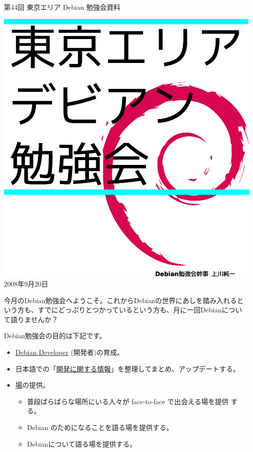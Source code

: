 \documentclass[mingoth,a4paper]{jsarticle}
\newcommand{\debmtgyear}{2008}
\newcommand{\debmtgmonth}{9}
\newcommand{\debmtgdate}{20}
\newcommand{\debmtgnumber}{44}
\begin{document}
\begin{titlepage}
\thispagestyle{empty}


\vspace*{-2cm}
第\debmtgnumber{}回 東京エリア Debian 勉強会資料

\hspace*{-2.4cm}
\includegraphics[width=210mm]{image200801/2008title.eps}\\
\hfill{}\debmtgyear{}年\debmtgmonth{}月\debmtgdate{}日

\end{titlepage}

 
 今月のDebian勉強会へようこそ。これからDebianの世界にあしを踏み入れると
 いう方も、すでにどっぷりとつかっているという方も、月に一回Debianについ
 て語りませんか？

 Debian勉強会の目的は下記です。

\begin{itemize}
 \item \underline{Debian Developer} (開発者)の育成。
 \item 日本語での「\underline{開発に関する情報}」を整理してまとめ、アップデートする。
 \item \underline{場}の提供。
 \begin{itemize}
  \item 普段ばらばらな場所にいる人々が face-to-face で出会える場を提供
	する。
  \item Debian のためになることを語る場を提供する。
  \item Debianについて語る場を提供する。
 \end{itemize}
\end{itemize}		
\end{document}
